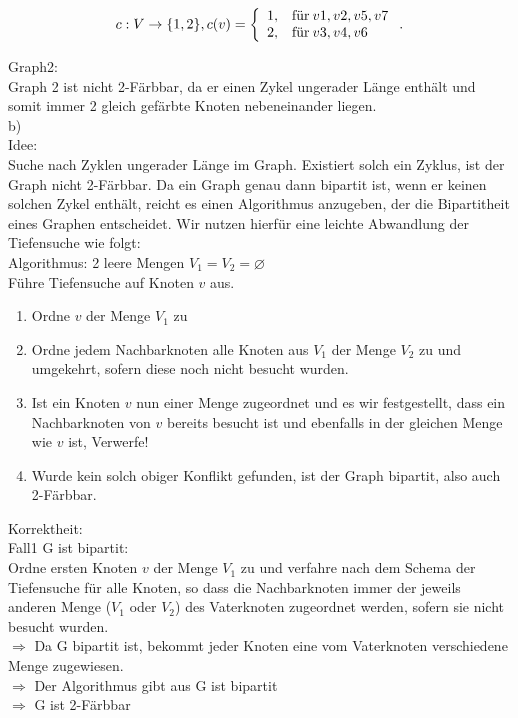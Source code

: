  \[
     c: V \rightarrow \{1,2\}, c(v)=\left\{\begin{array}{ll} 1, & $für$ \:v1, v2, v5, v7 \\
         2, & $für$ \: v3, v4, v6\end{array}\right. .
  \]

Graph2:\\
Graph 2 ist nicht 2-Färbbar, da er einen Zykel ungerader Länge enthält und somit immer 2
gleich gefärbte Knoten nebeneinander liegen.\\

b)\\
Idee:\\
Suche nach Zyklen ungerader Länge im Graph. Existiert solch ein Zyklus, ist der Graph
nicht 2-Färbbar. Da ein Graph genau dann bipartit ist, wenn er keinen solchen Zykel
enthält, reicht es einen Algorithmus anzugeben, der die Bipartitheit eines
Graphen entscheidet. Wir nutzen hierfür eine leichte Abwandlung der Tiefensuche wie folgt:\\

Algorithmus:  2 leere Mengen $V_{1} = V_{2} = \varnothing$\\
Führe Tiefensuche auf Knoten $v$ aus.
\begin{enumerate}
\item Ordne $v$ der Menge $V_1$ zu
\item Ordne jedem Nachbarknoten alle Knoten aus $V_1$ der Menge $V_2$ zu und umgekehrt, sofern
diese noch nicht besucht wurden.
\item Ist ein Knoten $v$ nun einer Menge zugeordnet und es wir festgestellt, dass ein 
Nachbarknoten von $v$ bereits besucht ist und ebenfalls in der gleichen Menge wie $v$ ist,
Verwerfe!
\item Wurde kein solch obiger Konflikt gefunden, ist der Graph bipartit, also auch 2-Färbbar.
\end{enumerate}

Korrektheit:\\

Fall1 G ist bipartit:\\
Ordne ersten Knoten $v$ der Menge $V_1$ zu und verfahre nach dem Schema der Tiefensuche
für alle Knoten, so dass die Nachbarknoten immer der jeweils anderen Menge ($V_1$ oder $V_2$)
des Vaterknoten zugeordnet werden, sofern sie nicht besucht wurden.\\
$\Rightarrow$ Da G bipartit ist, bekommt jeder Knoten eine vom Vaterknoten verschiedene Menge zugewiesen.\\
$\Rightarrow$ Der Algorithmus gibt aus G ist bipartit\\
$\Rightarrow$ G ist 2-Färbbar\\

